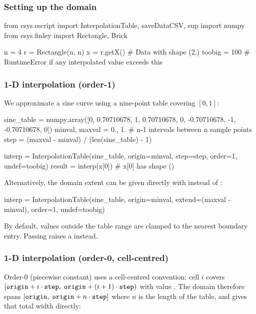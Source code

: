 \subsubsection{Setting up the domain}

\begin{python}
from esys.escript import InterpolationTable, saveDataCSV, sup
import numpy
from esys.finley import Rectangle, Brick

n = 4
r = Rectangle(n, n)
x = r.getX()   # Data with shape (2,)
toobig = 100   # RuntimeError if any interpolated value exceeds this
\end{python}

\subsubsection{1-D interpolation (order-1)}

We approximate a sine curve using a nine-point table covering $[0,1]$:

\begin{python}
sine_table = numpy.array([0, 0.70710678, 1, 0.70710678, 0,
                          -0.70710678, -1, -0.70710678, 0])
minval, maxval = 0., 1.
# n-1 intervals between n sample points
step = (maxval - minval) / (len(sine_table) - 1)

interp = InterpolationTable(sine_table, origin=minval, step=step,
                            order=1, undef=toobig)
result = interp(x[0])    # x[0] has shape ()
\end{python}

\noindent Alternatively, the domain extent can be given directly with
 instead of :

\begin{python}
interp = InterpolationTable(sine_table, origin=minval,
                            extend=(maxval - minval), order=1, undef=toobig)
\end{python}

\noindent By default, values outside the table range are clamped to the
nearest boundary entry.  Passing  raises a
 instead.

\subsubsection{1-D interpolation (order-0, cell-centred)}

Order-0 (piecewise constant) uses a cell-centred convention: cell $i$
covers $[\texttt{origin}+i\cdot\texttt{step},\; \texttt{origin}+(i+1)\cdot\texttt{step})$
with value .
The domain therefore spans $[\texttt{origin},\;\texttt{origin}+n\cdot\texttt{step}]$
where $n$ is the length of the table, and  gives that total width
directly:

